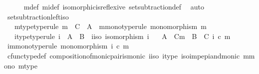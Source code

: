 \begin{isabellebody}
\ \ \ \ \isamarkupfalse%
\ {\isasymchi}m{\isacharunderscore}{\kern0pt}def\ {\isasymchi}mi{\isacharunderscore}{\kern0pt}def\ isomorphic{\isacharunderscore}{\kern0pt}is{\isacharunderscore}{\kern0pt}reflexive\ set{\isacharunderscore}{\kern0pt}subtraction{\isacharunderscore}{\kern0pt}def\ \isamarkupfalse%
\ auto\isanewline
{}\isamarkupfalse%
%
\endisatagproof
{\isafoldproof}%
%
\isadelimproof
\isanewline
%
\endisadelimproof
\isanewline
{}\isamarkupfalse%
\ set{\isacharunderscore}{\kern0pt}subtraction{\isacharunderscore}{\kern0pt}left{\isacharunderscore}{\kern0pt}iso{\isacharcolon}{\kern0pt}\isanewline
\ \ \ m{\isacharunderscore}{\kern0pt}type{\isacharbrackleft}{\kern0pt}type{\isacharunderscore}{\kern0pt}rule{\isacharbrackright}{\kern0pt}{\isacharcolon}{\kern0pt}\ {\isachardoublequoteopen}m\ {\isacharcolon}{\kern0pt}\ C\ {\isasymrightarrow}\ A{\isachardoublequoteclose}\ \ m{\isacharunderscore}{\kern0pt}mono{\isacharbrackleft}{\kern0pt}type{\isacharunderscore}{\kern0pt}rule{\isacharbrackright}{\kern0pt}{\isacharcolon}{\kern0pt}\ {\isachardoublequoteopen}monomorphism\ m{\isachardoublequoteclose}\isanewline
\ \ \ i{\isacharunderscore}{\kern0pt}type{\isacharbrackleft}{\kern0pt}type{\isacharunderscore}{\kern0pt}rule{\isacharbrackright}{\kern0pt}{\isacharcolon}{\kern0pt}\ {\isachardoublequoteopen}i\ {\isacharcolon}{\kern0pt}\ A\ {\isasymrightarrow}\ B{\isachardoublequoteclose}\ \ i{\isacharunderscore}{\kern0pt}iso{\isacharcolon}{\kern0pt}\ {\isachardoublequoteopen}isomorphism\ i{\isachardoublequoteclose}\isanewline
\ \ \ {\isachardoublequoteopen}A\ {\isasymsetminus}\ {\isacharparenleft}{\kern0pt}C{\isacharcomma}{\kern0pt}m{\isacharparenright}{\kern0pt}\ {\isasymcong}\ B\ {\isasymsetminus}\ {\isacharparenleft}{\kern0pt}C{\isacharcomma}{\kern0pt}\ i\ {\isasymcirc}\isactrlsub c\ m{\isacharparenright}{\kern0pt}{\isachardoublequoteclose}\isanewline
%
\isadelimproof
%
\endisadelimproof
%
\isatagproof
{}\isamarkupfalse%
\ {\isacharminus}{\kern0pt}\isanewline
\ \ \isamarkupfalse%
\ im{\isacharunderscore}{\kern0pt}mono{\isacharbrackleft}{\kern0pt}type{\isacharunderscore}{\kern0pt}rule{\isacharbrackright}{\kern0pt}{\isacharcolon}{\kern0pt}\ {\isachardoublequoteopen}monomorphism\ {\isacharparenleft}{\kern0pt}i\ {\isasymcirc}\isactrlsub c\ m{\isacharparenright}{\kern0pt}{\isachardoublequoteclose}\isanewline
\ \ \ \ \isamarkupfalse%
\ cfunc{\isacharunderscore}{\kern0pt}type{\isacharunderscore}{\kern0pt}def\ composition{\isacharunderscore}{\kern0pt}of{\isacharunderscore}{\kern0pt}monic{\isacharunderscore}{\kern0pt}pair{\isacharunderscore}{\kern0pt}is{\isacharunderscore}{\kern0pt}monic\ i{\isacharunderscore}{\kern0pt}iso\ i{\isacharunderscore}{\kern0pt}type\ iso{\isacharunderscore}{\kern0pt}imp{\isacharunderscore}{\kern0pt}epi{\isacharunderscore}{\kern0pt}and{\isacharunderscore}{\kern0pt}monic\ m{\isacharunderscore}{\kern0pt}mono\ m{\isacharunderscore}{\kern0pt}type\ \isamarkupfalse%

\end{isabellebody}
